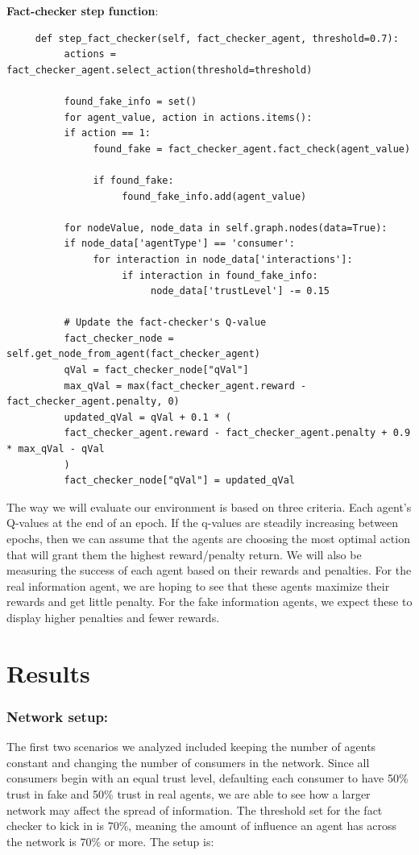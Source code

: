 \documentclass[twoside]{article}
\begin{document}
\textbf{Fact-checker step function}:

\begin{verbatim}
     def step_fact_checker(self, fact_checker_agent, threshold=0.7):
          actions = fact_checker_agent.select_action(threshold=threshold)

          found_fake_info = set()
          for agent_value, action in actions.items():
          if action == 1:
               found_fake = fact_checker_agent.fact_check(agent_value)
               
               if found_fake:
                    found_fake_info.add(agent_value)
          
          for nodeValue, node_data in self.graph.nodes(data=True):
          if node_data['agentType'] == 'consumer':
               for interaction in node_data['interactions']:
                    if interaction in found_fake_info:
                         node_data['trustLevel'] -= 0.15

          # Update the fact-checker's Q-value
          fact_checker_node = self.get_node_from_agent(fact_checker_agent)
          qVal = fact_checker_node["qVal"]
          max_qVal = max(fact_checker_agent.reward - fact_checker_agent.penalty, 0)
          updated_qVal = qVal + 0.1 * (
          fact_checker_agent.reward - fact_checker_agent.penalty + 0.9 * max_qVal - qVal
          )
          fact_checker_node["qVal"] = updated_qVal
\end{verbatim}

The way we will evaluate our environment is based on three criteria. Each agent's Q-values at the end of an epoch. If the q-values are steadily increasing between epochs, then we can assume that the agents are choosing the most optimal action that will grant them the highest reward/penalty return. We will also be measuring the success of each agent based on their rewards and penalties. For the real information agent, we are hoping to see that these agents maximize their rewards and get little penalty. For the fake information agents, we expect these to display higher penalties and fewer rewards.

\section{Results}
\subsubsection{Network setup: }
The first two scenarios we analyzed included keeping the number of agents constant and changing the number of consumers in the network. Since all consumers begin with an equal trust level, defaulting each consumer to have 50\% trust in fake and 50\% trust in real agents, we are able to see how a larger network may affect the spread of information. The threshold set for the fact checker to kick in is 70\%, meaning the amount of influence an agent has across the network is 70\% or more. The setup is:
\end{document}
